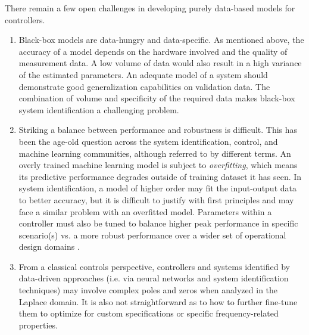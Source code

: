 
There remain a few open challenges in developing purely data-based models for controllers. 

\begin{enumerate}
    \item Black-box models are data-hungry and data-specific. As mentioned above, the accuracy of a model depends on the hardware involved and the quality of measurement data. A low volume of data would also result in a high variance of the estimated parameters. %
    An adequate model of a system should demonstrate good generalization capabilities on validation data. The combination of volume and specificity of the required data makes black-box system identification a challenging problem. 

    \item Striking a balance between performance and robustness is difficult. This has been the age-old question across the system identification, control, and machine learning communities, although referred to by different terms. An overly trained machine learning model is subject to \emph{overfitting}, which means its predictive performance degrades outside of training dataset it has seen. In system identification, a model of higher order may fit the input-output data to better accuracy, but it is difficult to justify with first principles and may face a similar problem with an overfitted model. Parameters within a controller must also be tuned to balance higher peak performance in specific scenario(s) vs. a more robust performance over a wider set of operational design domains \cite{tan_et_al}.
    
    \item From a classical controls perspective, controllers and systems identified by data-driven approaches (i.e. via neural networks and system identification techniques) may involve complex poles and zeros when analyzed in the Laplace domain. %
    It is also not straightforward as to how to further fine-tune them to optimize for custom specifications or specific frequency-related properties. 
    

\end{enumerate}

